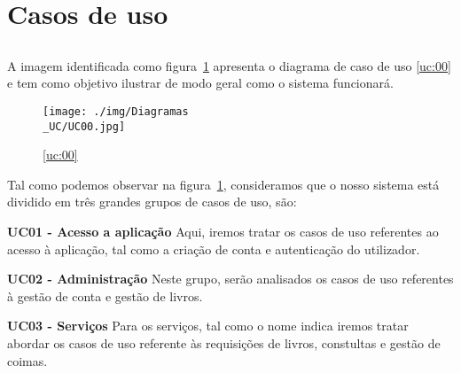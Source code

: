\section{Casos de uso}

\subsection{}
A imagem identificada como figura~\ref{fig:chap210} apresenta o diagrama de caso de uso \ref{uc:00} e tem como objetivo ilustrar de modo geral como o sistema funcionará.

\vspace*{5mm}

\begin{figure}[H]
	\centering
	\texttt{[image: ./img/Diagramas\\\_UC/UC00.jpg]}  %
	\caption{\ref{uc:00}}
	\label{fig:chap210}
\end{figure}

\par Tal como podemos observar na figura~\ref{fig:chap210}, consideramos que o nosso sistema está dividido em três grandes grupos de casos de uso, são:

\textbf{UC01 - Acesso a aplicação}  Aqui, iremos tratar os casos de uso referentes ao acesso à aplicação, tal como a criação de conta e autenticação do utilizador.

\textbf{UC02 - Administração}  Neste grupo, serão analisados os casos de uso referentes à gestão de conta e gestão de livros.

\textbf{UC03 - Serviços}  Para os serviços, tal como o nome indica iremos tratar abordar os casos de uso referente às requisições de livros, constultas e gestão de coimas.